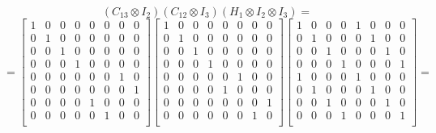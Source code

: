 \documentclass{../notatki}
\begin{document}
$$
(C_{13} \otimes I_2)(C_{12} \otimes I_3)(H_1 \otimes I_2 \otimes I_3) =
$$
$$
=
\begin{bmatrix}
  1 & 0 & 0 & 0 & 0 & 0 & 0 & 0 \\
  0 & 1 & 0 & 0 & 0 & 0 & 0 & 0 \\
  0 & 0 & 1 & 0 & 0 & 0 & 0 & 0 \\
  0 & 0 & 0 & 1 & 0 & 0 & 0 & 0 \\
  0 & 0 & 0 & 0 & 0 & 0 & 1 & 0 \\
  0 & 0 & 0 & 0 & 0 & 0 & 0 & 1 \\
  0 & 0 & 0 & 0 & 1 & 0 & 0 & 0 \\
  0 & 0 & 0 & 0 & 0 & 1 & 0 & 0 \\
\end{bmatrix}
\begin{bmatrix}
  1 & 0 & 0 & 0 & 0 & 0 & 0 & 0 \\
  0 & 1 & 0 & 0 & 0 & 0 & 0 & 0 \\
  0 & 0 & 1 & 0 & 0 & 0 & 0 & 0 \\
  0 & 0 & 0 & 1 & 0 & 0 & 0 & 0 \\
  0 & 0 & 0 & 0 & 0 & 1 & 0 & 0 \\
  0 & 0 & 0 & 0 & 1 & 0 & 0 & 0 \\
  0 & 0 & 0 & 0 & 0 & 0 & 0 & 1 \\
  0 & 0 & 0 & 0 & 0 & 0 & 1 & 0 \\
\end{bmatrix}
\begin{bmatrix}
  1 & 0 & 0 & 0 & 1 & 0 & 0 & 0 \\
  0 & 1 & 0 & 0 & 0 & 1 & 0 & 0 \\
  0 & 0 & 1 & 0 & 0 & 0 & 1 & 0 \\
  0 & 0 & 0 & 1 & 0 & 0 & 0 & 1 \\
  1 & 0 & 0 & 0 & 1 & 0 & 0 & 0 \\
  0 & 1 & 0 & 0 & 0 & 1 & 0 & 0 \\
  0 & 0 & 1 & 0 & 0 & 0 & 1 & 0 \\
  0 & 0 & 0 & 1 & 0 & 0 & 0 & 1 \\
\end{bmatrix}=
$$
\end{document}
